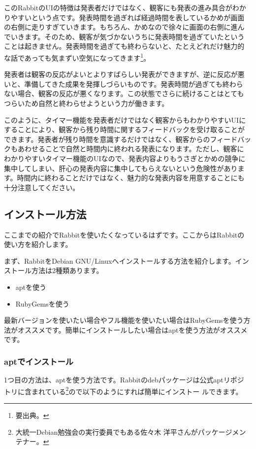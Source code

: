 \documentclass[mingoth,a4paper]{jsarticle}
\begin{document}
このRabbitのUIの特徴は発表者だけではなく、観客にも発表の進み具合がわか
りやすいという点です。発表時間を過ぎれば経過時間を表しているかめが画面
の右側に走りすぎていきます。もちろん、かめなので徐々に画面の右側に進ん
でいきます。そのため、観客が気づかないうちに発表時間を過ぎていたという
ことは起きません。発表時間を過ぎても終わらないと、たとえどれだけ魅力的
な話であっても気まずい空気になってきます\footnote{要出典。}。

発表者は観客の反応がよいとよりすばらしい発表ができますが、逆に反応が悪
いと、準備してきた成果を発揮しづらいものです。発表時間が過ぎても終わら
ない場合、観客の反応が悪くなります。この状態でさらに続けることはとても
つらいため自然と終わらせようという力が働きます。

このように、タイマー機能を発表者だけではなく観客からもわかりやすいUIに
することにより、観客から残り時間に関するフィードバックを受け取ることが
できます。発表者が残り時間を意識するだけではなく、観客からのフィードバッ
クもあわせることで自然と時間内に終われる発表になります。ただし、観客に
わかりやすいタイマー機能のUIなので、発表内容よりもうさぎとかめの競争に
集中してしまい、肝心の発表内容に集中してもらえないという危険性がありま
す。時間内に終わることだけではなく、魅力的な発表内容を用意することにも
十分注意してください。

\subsection{インストール方法}

ここまでの紹介でRabbitを使いたくなっているはずです。ここからはRabbitの
使い方を紹介します。

まず、RabbitをDebian GNU/Linuxへインストールする方法を紹介します。イン
ストール方法は2種類あります。

\begin{itemize}
\item aptを使う
\item RubyGemsを使う
\end{itemize}

最新バージョンを使いたい場合やフル機能を使いたい場合はRubyGemsを使う方
法がオススメです。簡単にインストールしたい場合はaptを使う方法がオススメ
です。

\subsubsection{aptでインストール}

1つ目の方法は、aptを使う方法です。Rabbitのdebパッケージは公式aptリポジ
トリに含まれている\footnote{大統一Debian勉強会の実行委員でもある佐々木
  洋平さんがパッケージメンテナー。}ので以下のようにすれば簡単にインストー
ルできます。
\end{document}
